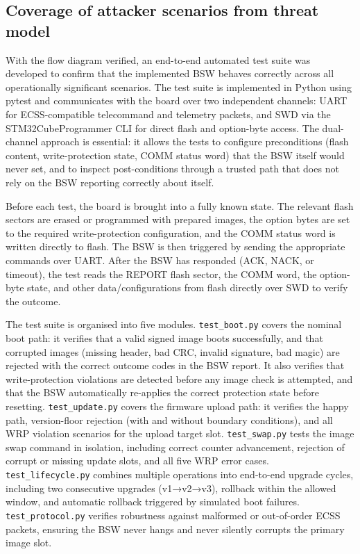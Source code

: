 \subsection{Coverage of attacker scenarios from threat model}
\label{section:eval-securityAnalysis-scenarios}

With the flow diagram verified, an end-to-end automated test suite was developed to confirm that the implemented BSW behaves correctly across all operationally significant scenarios. The test suite is implemented in Python using pytest and communicates with the board over two independent channels: UART for ECSS-compatible telecommand and telemetry packets, and SWD via the STM32CubeProgrammer CLI for direct flash and option-byte access. The dual-channel approach is essential: it allows the tests to configure preconditions (flash content, write-protection state, COMM status word) that the BSW itself would never set, and to inspect post-conditions through a trusted path that does not rely on the BSW reporting correctly about itself.

Before each test, the board is brought into a fully known state. The relevant flash sectors are erased or programmed with prepared images, the option bytes are set to the required write-protection configuration, and the COMM status word is written directly to flash. The BSW is then triggered by sending the appropriate commands over UART. After the BSW has responded (ACK, NACK, or timeout), the test reads the REPORT flash sector, the COMM word, the option-byte state, and other data/configurations from flash directly over SWD to verify the outcome.

The test suite is organised into five modules. \texttt{test\_boot.py} covers the nominal boot path: it verifies that a valid signed image boots successfully, and that corrupted images (missing header, bad CRC, invalid signature, bad magic) are rejected with the correct outcome codes in the BSW report. It also verifies that write-protection violations are detected before any image check is attempted, and that the BSW automatically re-applies the correct protection state before resetting. \texttt{test\_update.py} covers the firmware upload path: it verifies the happy path, version-floor rejection (with and without boundary conditions), and all WRP violation scenarios for the upload target slot. \texttt{test\_swap.py} tests the image swap command in isolation, including correct counter advancement, rejection of corrupt or missing update slots, and all five WRP error cases. \texttt{test\_lifecycle.py} combines multiple operations into end-to-end upgrade cycles, including two consecutive upgrades (v1→v2→v3), rollback within the allowed window, and automatic rollback triggered by simulated boot failures. \texttt{test\_protocol.py} verifies robustness against malformed or out-of-order ECSS packets, ensuring the BSW never hangs and never silently corrupts the primary image slot.

